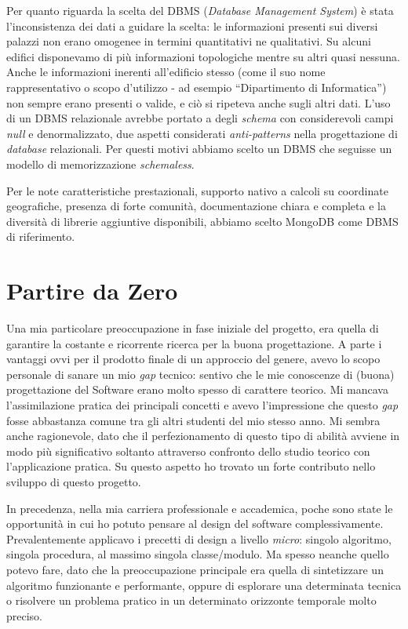 \documentclass[12pt]{report}
\begin{document}
Per quanto riguarda la scelta del DBMS (\textit{Database Management
System}) è stata l'inconsistenza dei dati a guidare la scelta: le
informazioni presenti sui diversi palazzi non erano omogenee in
termini quantitativi ne qualitativi. Su alcuni edifici disponevamo di
più informazioni topologiche mentre su altri quasi nessuna. Anche le
informazioni inerenti all'edificio stesso (come il suo nome rappresentativo o
scopo d'utilizzo - ad esempio ``Dipartimento di Informatica'') non sempre
erano presenti o valide, e ciò si ripeteva anche sugli altri dati. L'uso di un
DBMS relazionale avrebbe portato a degli \textit{schema} con considerevoli
campi \textit{null} e denormalizzato, due aspetti considerati
\textit{anti-patterns} nella progettazione di \textit{database} relazionali.
Per questi motivi abbiamo scelto un DBMS che seguisse un modello di
memorizzazione \textit{schemaless}. 

Per le note caratteristiche prestazionali, supporto nativo a calcoli
su coordinate geografiche, presenza di forte comunità, documentazione
chiara e completa e la diversità di librerie aggiuntive disponibili,
abbiamo scelto MongoDB come DBMS di riferimento.

\section{Partire da Zero}

Una mia particolare preoccupazione in fase iniziale del progetto, era
quella di garantire la costante e ricorrente ricerca per la buona
progettazione. A parte i vantaggi ovvi per il prodotto finale di un
approccio del genere, avevo lo scopo personale di sanare un mio
\textit{gap} tecnico: sentivo che le mie conoscenze di (buona)
progettazione del Software erano molto spesso di carattere teorico. 
Mi mancava l'assimilazione pratica dei principali concetti e avevo
l'impressione che questo \textit{gap} fosse abbastanza comune tra gli altri
studenti del mio stesso anno. Mi sembra anche ragionevole, dato che il
perfezionamento di questo tipo di abilità avviene in modo più
significativo soltanto attraverso confronto dello studio teorico con
l'applicazione pratica. Su questo aspetto ho trovato un forte contributo nello
sviluppo di questo progetto.

In precedenza, nella mia carriera professionale e accademica, poche
sono state le opportunità in cui ho potuto pensare al design del
software complessivamente. Prevalentemente applicavo i precetti 
di design a livello \textit{micro}: singolo algoritmo,
singola procedura, al massimo singola classe/modulo. Ma spesso
neanche quello potevo fare, dato che la preoccupazione principale era
quella di sintetizzare un algoritmo funzionante e performante, oppure
di esplorare una determinata tecnica o risolvere un problema pratico in un
determinato orizzonte temporale molto preciso.
\end{document}
